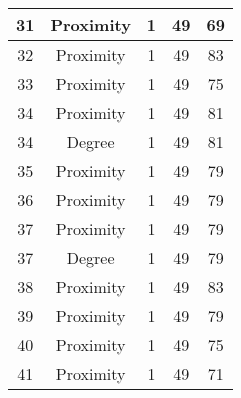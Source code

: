 \documentclass[results.tex]{subfiles}
\begin{document}
\begin{center}
\begin{tabular}{| c || c | c | c | c |}
            \hline
            31                      & Proximity                    & 1                      & 49                      & 69                   \\
            \hline
            32                      & Proximity                    & 1                      & 49                      & 83                   \\
            \hline
            33                      & Proximity                    & 1                      & 49                      & 75                   \\
            \hline
            34                      & Proximity                    & 1                      & 49                      & 81                   \\
            \hline
            34                      & Degree                       & 1                      & 49                      & 81                   \\
            \hline
            35                      & Proximity                    & 1                      & 49                      & 79                   \\
            \hline
            36                      & Proximity                    & 1                      & 49                      & 79                   \\
            \hline
            37                      & Proximity                    & 1                      & 49                      & 79                   \\
            \hline
            37                      & Degree                       & 1                      & 49                      & 79                   \\
            \hline
            38                      & Proximity                    & 1                      & 49                      & 83                   \\
            \hline
            39                      & Proximity                    & 1                      & 49                      & 79                   \\
            \hline
            40                      & Proximity                    & 1                      & 49                      & 75                   \\
            \hline
            41                      & Proximity                    & 1                      & 49                      & 71                   \\

\end{tabular}
\end{center}
\end{document}
